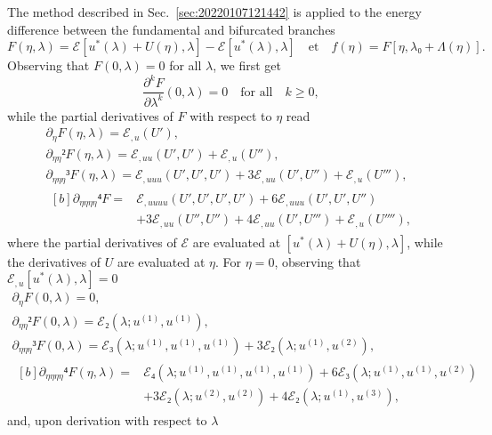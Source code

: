 \documentclass[12pt, final]{scrartcl}
\theoremstyle{definition}
\newcommand{\E}{\mathcal E}
\newcommand{\order}[2][1]{#2^{(#1)}}
\begin{document}
The method described in Sec.~\ref{sec:20220107121442} is applied to the energy
difference between the fundamental and bifurcated branches
\begin{equation}
  F(η, \lambda) = \E[u^{\ast}(\lambda) + U(η), \lambda] - \E[u^{\ast}(\lambda), \lambda]
  \quad \text{et} \quad
  f(η) = F [η, \lambda₀ + \Lambda(η)].
\end{equation}
Observing that $F(0, \lambda) = 0$ for all $\lambda$, we first get
\begin{equation*}
  \frac{∂^k F}{∂ \lambda^k}(0, \lambda) = 0 \quad \text{for all} \quad k ≥ 0,
\end{equation*}
while the partial derivatives of $F$ with respect to $η$ read
\begin{gather*}
  ∂_{η} F(η, \lambda) = \E_{, u}(U'),\\
  ∂_{ηη}² F(η, \lambda) = \E_{, uu} (U', U') + \E_{, u} (U''),\\
  ∂_{ηηη}³ F(η, \lambda) = \E_{, uuu}(U', U', U') + 3\E_{, uu}(U', U'') + \E_{, u}(U'''),\\
  \begin{aligned}[b]
    ∂_{ηηηη}⁴ F ={}
    & \E_{, uuuu}(U', U', U', U') + 6\E_{,uuu}(U', U', U'')\\
    & + 3\E_{, uu}(U'', U'') + 4\E_{, uu}(U', U''') + \E_{, u}(U''''),
  \end{aligned}
\end{gather*}
where the partial derivatives of $\E$ are evaluated at
$[u^{\ast}(\lambda) + U(η), \lambda]$, while the derivatives of $U$ are evaluated at
$η$. For $η = 0$, observing that $\E_{, u}[u^{\ast}(\lambda), \lambda] = 0$
\begin{gather*}
  ∂_{η} F(0, \lambda) = 0,\\
  ∂_{ηη}² F(0, \lambda) =\E₂(\lambda ; \order[1]u, \order[1]u),\\
  ∂_{ηηη}³ F(0, \lambda) = \E₃(\lambda; \order[1]u, \order[1]u, \order[1]u) + 3\E₂(\lambda; \order[1]u, \order[2]u),\\
  \begin{aligned}[b]
    ∂_{ηηηη}⁴ F(η, \lambda) ={} & \E₄(\lambda; \order[1]u, \order[1]u, \order[1]u, \order[1]u) + 6\E₃(\lambda; \order[1]u, \order[1]u, \order[2]u)\\
    & + 3\E₂(\lambda; \order[2]u, \order[2]u) + 4\E₂(\lambda; \order[1]u, \order[3]u),
  \end{aligned}
\end{gather*}
and, upon derivation with respect to $\lambda$
\end{document}
